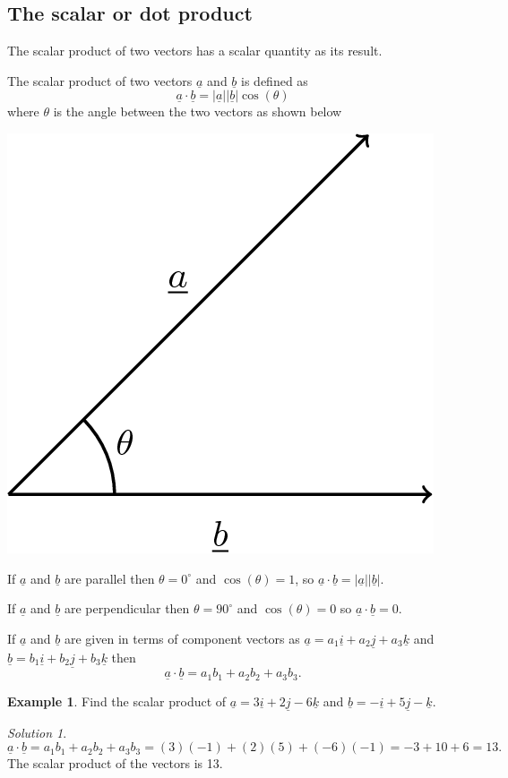 \documentclass[
  11pt,
  oneside]{book}
\newcommand{\slide}{}
\theoremstyle{definition}
\theoremstyle{definition}
\newtheorem{example}{Example}[chapter]
\theoremstyle{definition}
\theoremstyle{definition}
\theoremstyle{remark}
\newtheorem*{solution}{Solution}
\begin{document}
\slide

\subsection{The scalar or dot product}\label{the-scalar-or-dot-product}

The scalar product of two vectors has a scalar quantity as its result.

The scalar product of two vectors \(\underline a\) and \(\underline b\) is defined as
\[
\underline a \cdot\underline b = |\underline a||\underline b|\cos(\theta)
\]
where \(\theta\) is the angle between the two vectors as shown below

\begin{center}\includegraphics[width=0.2\linewidth]{tikztopng-figure62} \end{center}

If \(\underline a\) and \(\underline b\) are parallel then \(\theta = 0^\circ\) and \(\cos(\theta) = 1\), so \(\underline a \cdot\underline b = |\underline a||\underline b|\).

If \(\underline a\) and \(\underline b\) are perpendicular then \(\theta = 90^\circ\) and \(\cos(\theta) = 0\) so \(\underline a \cdot\underline b = 0\).

\slide

If \(\underline a\) and \(\underline b\) are given in terms of component vectors as \(\underline a = a_1\underline i + a_2\underline j + a_3\underline k\) and \(\underline b = b_1\underline i + b_2\underline j + b_3\underline k\) then
\[
\underline a \cdot\underline b = a_1b_1 + a_2b_2 + a_3b_3.
\]
\slide

\begin{example}
Find the scalar product of \(\underline a = 3\underline i + 2\underline j - 6\underline k\) and \(\underline b = -\underline i + 5\underline j - \underline k\).
\end{example}

\begin{solution}
\[
\underline a\cdot\underline b = a_1b_1 + a_2b_2 + a_3b_3 = (3)(-1)+(2)(5)+(-6)(-1) = -3+10+6=13.
\]
The scalar product of the vectors is 13.
\end{solution}
\end{document}

